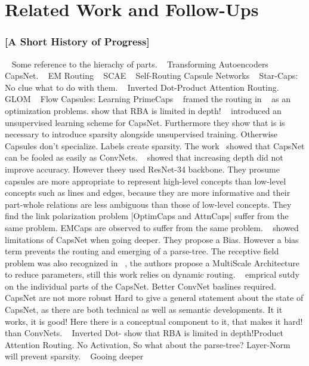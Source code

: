 \documentclass{article}
\begin{document}

\section{Related Work and Follow-Ups}

\subsubsection*{[A Short History of Progress]}
~\cite{cogsci/Hinton79} Some reference to the hierachy of parts.
~\cite{icann/HintonKW11} Transforming Autoencoders
~\cite{nips/SabourFH17} CapsNet.
~\cite{iclr/HintonSF18} EM Routing
~\cite{nips/KosiorekSTH19} SCAE
~\cite{nips/HahnPK19} Self-Routing Capsule Networks
~\cite{nips/AhmedT19} Star-Caps: No clue what to do with them.
~\cite{iclr/TsaiSGS20} Inverted Dot-Product Attention Routing.
~\cite{corr/Hinton2021} GLOM
~\cite{icml/SabourTYHF21} Flow Capsules: Learning PrimeCaps
~\cite{iclr/Wang018} framed the routing in ~\cite{nips/SabourFH17} as an optimization problems.
\cite{prl/PeerSR21} show that RBA is limited in depth!
~\cite{corr/Rawlinson2018} introduced an unsupervised learning scheme for CapsNet. Furthermore they show that is is necessary to introduce sparsity alongside unsupervised training. Otherwise Capsules don't specialize. Labels create sparsity.
The work~\cite{corr/Michels19} showed that CapsNet can be fooled as easily as ConvNets.
~\cite{acml/PaikKK19} showed that increasing depth did not improve accuracy. However theey used ResNet-34 backbone. They prosume
capsules are more appropriate to represent high-level concepts than low-level concepts
such as lines and edges, because they are more informative and their part-whole
relations are less ambiguous than those of low-level concepts. They find the link polarization problem [OptimCaps and AttnCaps] suffer from the same problem. EMCaps are observed to suffer from the same problem.
~\cite{prl/PeerSR21} showed limitations of CapsNet when going deeper. They propose a Bias. However a bias term prevents the routing and emerging of a parse-tree.
The receptive field problem was also recognized in ~\cite{spl/XiangZTZX18}, the authors propose a MultiScale Architecture to reduce parameters, still this work relies on dynamic routing.
~\cite{cvpr/GuT021} emprical sutdy on the individual parts of the CapsNet. Better ConvNet baslines required. CapsNet are not more robust 
Hard to give a general statement about the state of CapsNet, as there are both technical as well as semantic developments.
It it works, it is good! Here there is a conceptual component to it, that makes it hard!
than ConvNets.
~\cite{iclr/TsaiSGS20} Inverted Dot- \cite{prl/PeerSR21} show that RBA is limited in depth!Product Attention Routing. No Activation, So what about the parse-tree? Layer-Norm will prevent sparsity.
~\cite{cvpr/RajasegaranJJJS19} Gooing deeper
\end{document}
